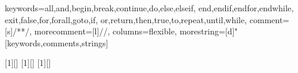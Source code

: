 \newenvironment{PauseHighLight}{
  \pausecolors{TwoColor}{TextColor}{HighLight}%
  \color{TwoColor}\pausehighlight}{}


 {keywords={all,and,begin,break,continue,do,else,elseif,%
     end,endif,endfor,endwhile,%
     exit,false,for,forall,goto,if,%
     or,return,then,true,to,repeat,until,while},%
  comment=[s]{/*}{*/},%
  morecomment=[l]//,%
  columns=flexible,%
  morestring=[d]"%
 }[keywords,comments,strings]




[1][]{}{}
[1][]{\lstset{escapechar=\$,#1}}{}
[1][]{\lstset{escapechar=\$,#1}}{}

\MyLogo{}

\newcommand{\keywords}[1]{\vfill{\noindent\it #1}}

\setcounter{outlineitem}{0}
\newcommand{\outlineitem}[2]{\item%
  \def\targ{\value{emumi}}%
  \ifnum\value{enumi}=\value{outlineitem}%
  \color{HighLight}\textbf{#1}\toptarget{#2}\color{TextColor}%
   \else\toplink{#2}{#1}\fi
}
\color{TwoColor}


\newcommand{\section}[2][0]{\foilhead[#1cm]{#2}}

\newenvironment{slide}{}{\pauselevel{=1}}

\raggedright
\newcommand{\Outline}{}

